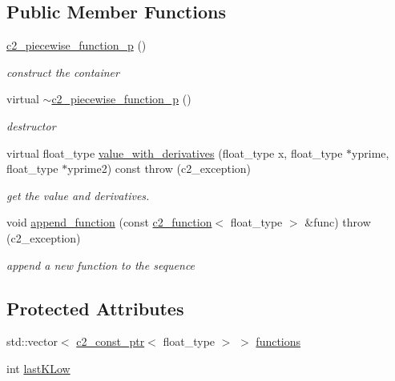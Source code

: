 \subsection*{Public Member Functions}
\begin{DoxyCompactItemize}
\item 
\hyperlink{classc2__piecewise__function__p_af97c8865a492b191be0d25146efd17e0}{c2\+\_\+piecewise\+\_\+function\+\_\+p} ()
\begin{DoxyCompactList}\small\item\em construct the container \end{DoxyCompactList}\item 
virtual \hyperlink{classc2__piecewise__function__p_ae4568a15bc298e69a25d1b05a25a3c1f}{$\sim$c2\+\_\+piecewise\+\_\+function\+\_\+p} ()
\begin{DoxyCompactList}\small\item\em destructor \end{DoxyCompactList}\item 
virtual float\+\_\+type \hyperlink{classc2__piecewise__function__p_a24dda73e84778fa9eb2160195403c45f}{value\+\_\+with\+\_\+derivatives} (float\+\_\+type x, float\+\_\+type $\ast$yprime, float\+\_\+type $\ast$yprime2) const   throw (c2\+\_\+exception)
\begin{DoxyCompactList}\small\item\em get the value and derivatives. \end{DoxyCompactList}\item 
void \hyperlink{classc2__piecewise__function__p_accaab7a03beef73ee88d6cfed30f52df}{append\+\_\+function} (const \hyperlink{classc2__function}{c2\+\_\+function}$<$ float\+\_\+type $>$ \&func)  throw (c2\+\_\+exception)
\begin{DoxyCompactList}\small\item\em append a new function to the sequence \end{DoxyCompactList}\end{DoxyCompactItemize}
\subsection*{Protected Attributes}
\begin{DoxyCompactItemize}
\item 
std\+::vector$<$ \hyperlink{classc2__const__ptr}{c2\+\_\+const\+\_\+ptr}$<$ float\+\_\+type $>$ $>$ \hyperlink{classc2__piecewise__function__p_aa408053c36b9fa349a5ea9b0b4badc0d}{functions}
\item 
int \hyperlink{classc2__piecewise__function__p_a8231d5c512db23c48712b7cba0ea0bca}{last\+K\+Low}
\end{DoxyCompactItemize}
